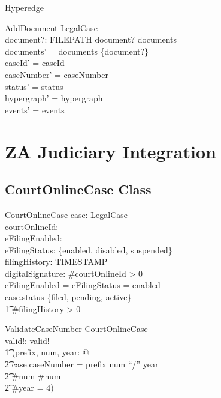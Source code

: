 \documentclass{article}
\begin{document}
\begin{class}{Hyperedge}
\begin{schema}{AddDocument}
    \Delta LegalCase \\
    document?: FILEPATH
\where
    document? \notin documents \\
    documents' = documents \cup \{document?\} \\
    caseId' = caseId \\
    caseNumber' = caseNumber \\
    status' = status \\
    hypergraph' = hypergraph \\
    events' = events
\end{schema}

\newpage

\section{ZA Judiciary Integration}

\subsection{CourtOnlineCase Class}

\begin{class}{CourtOnlineCase}
    case: LegalCase \\
    courtOnlineId: \seq \char \\
    eFilingEnabled: \bool \\
    eFilingStatus: \{enabled, disabled, suspended\} \\
    filingHistory: \seq TIMESTAMP \\
    digitalSignature: \seq \char
\where
    \#courtOnlineId > 0 \\
    eFilingEnabled = \true \iff eFilingStatus = enabled \\
    case.status \in \{filed, pending, active\} \implies \\
    \t1 \#filingHistory > 0
\end{class}

\begin{schema}{ValidateCaseNumber}
    \Xi CourtOnlineCase \\
    valid!: \bool
\where
    valid! \iff \\
    \t1 (\exists prefix, num, year: \seq \char @ \\
    \t2 case.caseNumber = prefix \cat num \cat ``/'' \cat year \land \\
    \t2 \#num  \land \#num  \land \\
    \t2 \#year = 4)
\end{schema}


\end{class}
\end{document}
